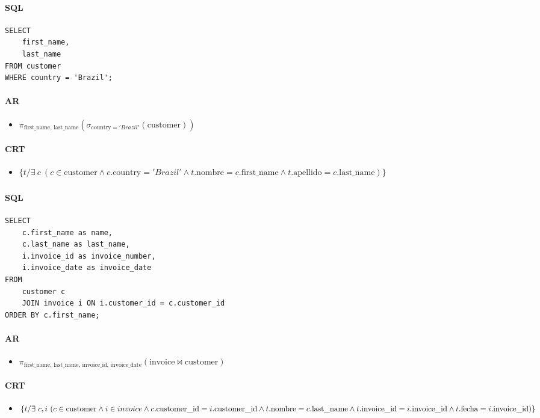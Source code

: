 \paragraph{SQL}
\begin{verbatim}
SELECT 
	first_name,
	last_name
FROM customer
WHERE country = 'Brazil';
\end{verbatim}
\paragraph{AR}
\begin{itemize}
	\item[] $\pi_{\text{first\_name, last\_name}}(\sigma_{\text{country} = 'Brazil'}(\text{customer}))$
\end{itemize}

\paragraph{CRT} 
\begin{itemize}
	\item[] $\{ t / \exists~c~(c\in \text{customer} \land c.\text{country} = 'Brazil' \land t.\text{nombre} = c.\text{first\_name} \land t.\text{apellido} = c.\text{last\_name})\}$
\end{itemize}

\newpage
\subsubsection{}
\paragraph{SQL}
\begin{verbatim}
SELECT
	c.first_name as name,
	c.last_name as last_name,
	i.invoice_id as invoice_number,
	i.invoice_date as invoice_date
FROM
	customer c
	JOIN invoice i ON i.customer_id = c.customer_id
ORDER BY c.first_name;
\end{verbatim}
\paragraph{AR}
\begin{itemize}
	\item[] $\pi_{\text{first\_name, last\_name, invoice\_id, invoice\_date}}(\text{invoice} \bowtie \text{customer})$
\end{itemize}

\paragraph{CRT} 
\begin{itemize}
	\item[] $\{ t / \exists~c,i~(c\in \text{customer} \land i\in invoice \land c.\text{customer\_id} = i.\text{customer\_id} \\ \land t.\text{nombre} = c.\text{last\_name} \land t.\text{invoice\_id} = i.\text{invoice\_id} \land t.\text{fecha} = i.\text{invoice\_id})\}$
\end{itemize}

